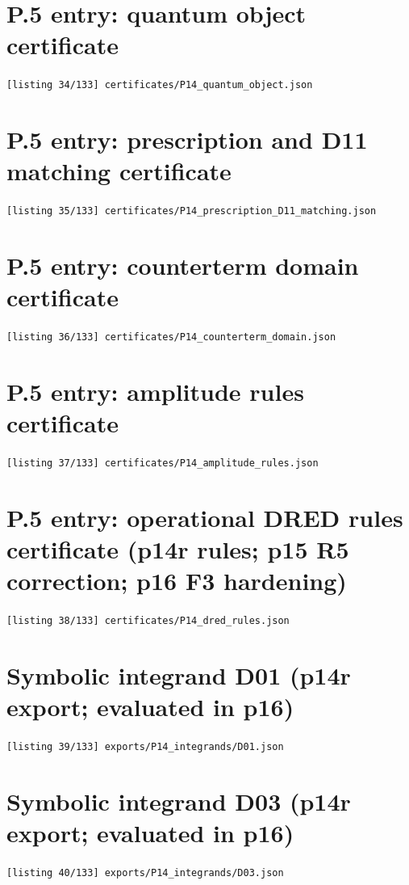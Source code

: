 \section{P.5 entry: quantum object certificate}
\noindent\texttt{[listing 34/133] certificates/P14\_quantum\_object.json}
{\scriptsize}

\section{P.5 entry: prescription and D11 matching certificate}
\noindent\texttt{[listing 35/133] certificates/P14\_prescription\_D11\_matching.json}
{\scriptsize}

\section{P.5 entry: counterterm domain certificate}
\noindent\texttt{[listing 36/133] certificates/P14\_counterterm\_domain.json}
{\scriptsize}

\section{P.5 entry: amplitude rules certificate}
\noindent\texttt{[listing 37/133] certificates/P14\_amplitude\_rules.json}
{\scriptsize}

\section{P.5 entry: operational DRED rules certificate (p14r rules; p15 R5 correction; p16 F3 hardening)}
\noindent\texttt{[listing 38/133] certificates/P14\_dred\_rules.json}
{\scriptsize}

\section{Symbolic integrand D01 (p14r export; evaluated in p16)}
\noindent\texttt{[listing 39/133] exports/P14\_integrands/D01.json}
{\scriptsize}

\section{Symbolic integrand D03 (p14r export; evaluated in p16)}
\noindent\texttt{[listing 40/133] exports/P14\_integrands/D03.json}
{\scriptsize}

